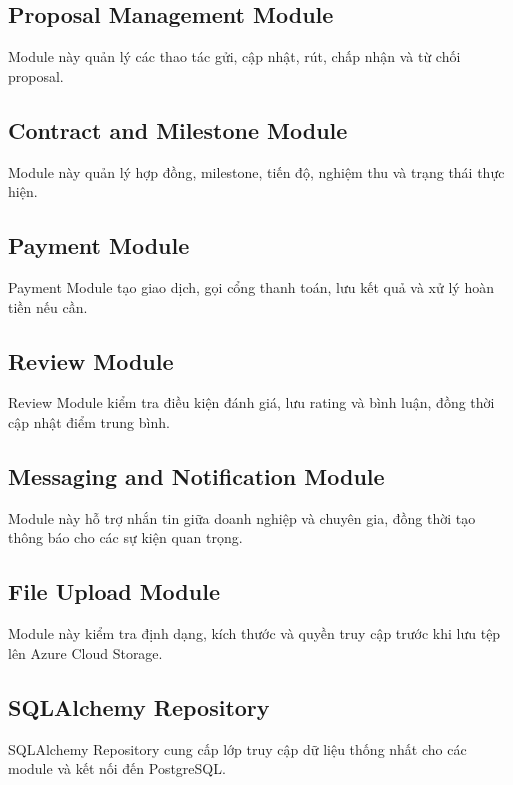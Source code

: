 \subsection{Proposal Management Module}

Module này quản lý các thao tác gửi, cập nhật, rút, chấp nhận và từ chối proposal.

\subsection{Contract and Milestone Module}

Module này quản lý hợp đồng, milestone, tiến độ, nghiệm thu và trạng thái thực hiện.

\subsection{Payment Module}

Payment Module tạo giao dịch, gọi cổng thanh toán, lưu kết quả và xử lý hoàn tiền nếu cần.

\subsection{Review Module}

Review Module kiểm tra điều kiện đánh giá, lưu rating và bình luận, đồng thời cập nhật điểm trung bình.

\subsection{Messaging and Notification Module}

Module này hỗ trợ nhắn tin giữa doanh nghiệp và chuyên gia, đồng thời tạo thông báo cho các sự kiện quan trọng.

\subsection{File Upload Module}

Module này kiểm tra định dạng, kích thước và quyền truy cập trước khi lưu tệp lên Azure Cloud Storage.

\subsection{SQLAlchemy Repository}

SQLAlchemy Repository cung cấp lớp truy cập dữ liệu thống nhất cho các module và kết nối đến PostgreSQL.


